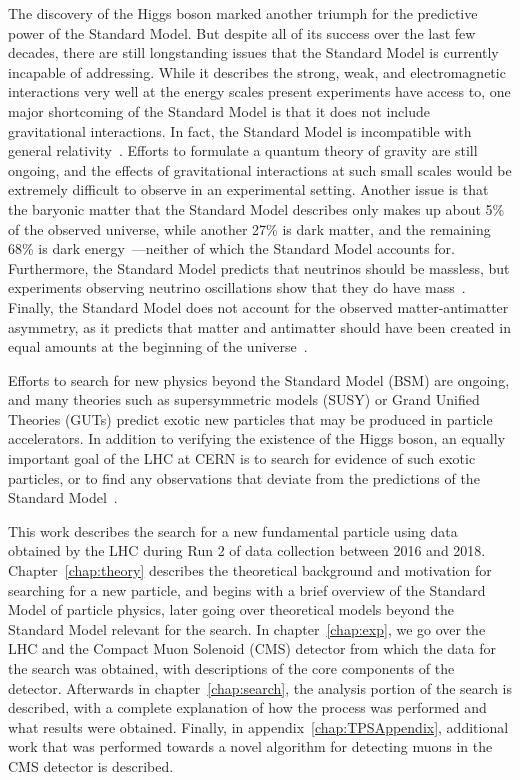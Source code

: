 The discovery of the Higgs boson marked another triumph for the predictive power of the Standard Model.
But despite all of its success over the last few decades, there are still longstanding issues that the Standard Model is currently incapable of addressing.
While it describes the strong, weak, and electromagnetic interactions very well at the energy scales present experiments have access to, one major shortcoming of the Standard Model is that it does not include gravitational interactions.
In fact, the Standard Model is incompatible with general relativity~\cite{Macias200899}.
Efforts to formulate a quantum theory of gravity are still ongoing, and the effects of gravitational interactions at such small scales would be extremely difficult to observe in an experimental setting.
Another issue is that the baryonic matter that the Standard Model describes only makes up about 5\% of the observed universe, while another 27\% is dark matter, and the remaining 68\% is dark energy~\cite{Planck2013}---neither of which the Standard Model accounts for.
Furthermore, the Standard Model predicts that neutrinos should be massless, but experiments observing neutrino oscillations show that they do have mass~\cite{Ahmad_2001}.
Finally, the Standard Model does not account for the observed matter-antimatter asymmetry, as it predicts that matter and antimatter should have been created in equal amounts at the beginning of the universe~\cite{astroParticle}.

Efforts to search for new physics beyond the Standard Model (BSM) are ongoing, and many theories such as supersymmetric models (SUSY) or Grand Unified Theories (GUTs) predict exotic new particles that may be produced in particle accelerators.
In addition to verifying the existence of the Higgs boson, an equally important goal of the LHC at CERN is to search for evidence of such exotic particles, or to find any observations that deviate from the predictions of the Standard Model~\cite{doi:10.1080/0010751031000077378,Kanti}.

This work describes the search for a new fundamental particle using data obtained by the LHC during Run 2 of data collection between 2016 and 2018.
Chapter~\ref{chap:theory} describes the theoretical background and motivation for searching for a new particle, and begins with a brief overview of the Standard Model of particle physics, later going over theoretical models beyond the Standard Model relevant for the search.
In chapter~\ref{chap:exp}, we go over the LHC and the Compact Muon Solenoid (CMS) detector from which the data for the search was obtained, with descriptions of the core components of the detector.
Afterwards in chapter~\ref{chap:search}, the analysis portion of the search is described, with a complete explanation of how the process was performed and what results were obtained.
Finally, in appendix~\ref{chap:TPSAppendix}, additional work that was performed towards a novel algorithm for detecting muons in the CMS detector is described.
